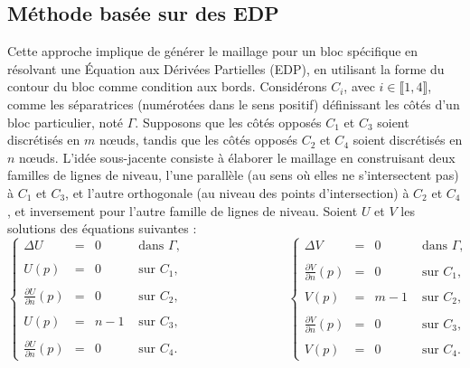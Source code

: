 \subsection{Méthode basée sur des EDP}
Cette approche implique de générer le maillage pour un bloc spécifique en résolvant une Équation aux Dérivées Partielles (EDP), en utilisant la forme du contour du bloc comme condition aux bords. Considérons $C_i$, avec $i \in \llbracket 1, 4 \rrbracket$, comme les séparatrices (numérotées dans le sens positif) définissant les côtés d'un bloc particulier, noté $\Gamma$. Supposons que les côtés opposés $C_1$ et $C_3$ soient discrétisés en $m$ nœuds, tandis que les côtés opposés $C_2$ et $C_4$ soient discrétisés en $n$ nœuds. L'idée sous-jacente consiste à élaborer le maillage en construisant deux familles de lignes de niveau, l'une parallèle (au sens où elles ne s'intersectent pas) à $C_1$ et $C_3$, et l'autre orthogonale (au niveau des points d'intersection) à $C_2$ et $C_4$, et inversement pour l'autre famille de lignes de niveau. Soient $U$ et $V$ les solutions des équations suivantes :
$$
\left\{
\begin{array}{lcll}
\Delta U &=& 0 &\mbox{ dans }\Gamma,\\\\
U(p)&=& 0 & \mbox{ sur } C_1,\\\\
\displaystyle\frac{\partial U}{\partial n}(p)&=&0 & \mbox{ sur } C_2,\\\\
U(p)&=& n-1 & \mbox{ sur } C_3,\\\\
\displaystyle\frac{\partial U}{\partial n}(p)&=&0 & \mbox{ sur } C_4.
\end{array}
\right.
\quad\quad\quad\quad\quad\quad\quad\quad
\left\{
\begin{array}{lcll}
\Delta V &=& 0 &\mbox{ dans }\Gamma,\\\\
\displaystyle\frac{\partial V}{\partial n}(p)&=&0 & \mbox{ sur } C_1,\\\\
V(p)&=& m-1 & \mbox{ sur } C_2,\\\\
\displaystyle\frac{\partial V}{\partial n}(p)&=&0 & \mbox{ sur } C_3,\\\\
V(p)&=& 0 & \mbox{ sur } C_4.
\end{array}
\right.
$$
\[\]
